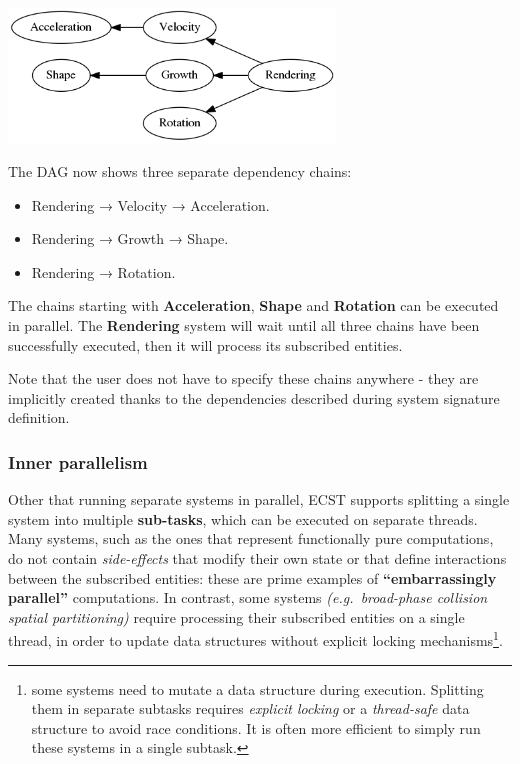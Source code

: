 \documentclass[twoside, 12pt, a4paper, openany]{book}
\let\origfigure=\figure
\let\endorigfigure=\endfigure
\renewenvironment{figure}[1][]{%
\origfigure[H]
}{%
\endorigfigure
}
\begin{document}
\begin{figure}[htbp]
\centering
\includegraphics[width=0.65000\textwidth]{source/figures/generated/ecst/overview/multithreading/outer/dag1.png}
\caption{ECST multithreading: example outer parallelism DAG \#1}
\end{figure}

The DAG now shows three separate dependency chains:

\begin{itemize}
\item
  Rendering → Velocity → Acceleration.
\item
  Rendering → Growth → Shape.
\item
  Rendering → Rotation.
\end{itemize}

The chains starting with \textbf{Acceleration}, \textbf{Shape} and
\textbf{Rotation} can be executed in parallel. The \textbf{Rendering}
system will wait until all three chains have been successfully executed,
then it will process its subscribed entities.

Note that the user does not have to specify these chains anywhere - they
are implicitly created thanks to the dependencies described during
system signature definition.

\subsubsection{Inner parallelism}\label{inner-parallelism}

Other that running separate systems in parallel, ECST supports splitting
a single system into multiple \textbf{sub-tasks}, which can be executed
on separate threads. Many systems, such as the ones that represent
functionally pure computations, do not contain \emph{side-effects} that
modify their own state or that define interactions between the
subscribed entities: these are prime examples of
\textbf{``embarrassingly parallel''} computations. In contrast, some
systems \emph{(e.g.~broad-phase collision spatial partitioning)} require
processing their subscribed entities on a single thread, in order to
update data structures without explicit locking mechanisms\footnote{some
  systems need to mutate a data structure during execution. Splitting
  them in separate subtasks requires \emph{explicit locking} or a
  \emph{thread-safe} data structure to avoid race conditions. It is
  often more efficient to simply run these systems in a single subtask.}.
\end{document}
